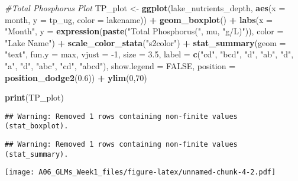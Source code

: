 \documentclass[]{article}
\newenvironment{Shaded}{\begin{snugshade}}{\end{snugshade}}
\newcommand{\CommentTok}[1]{\textcolor[rgb]{0.56,0.35,0.01}{\textit{#1}}}
\newcommand{\DataTypeTok}[1]{\textcolor[rgb]{0.13,0.29,0.53}{#1}}
\newcommand{\DecValTok}[1]{\textcolor[rgb]{0.00,0.00,0.81}{#1}}
\newcommand{\FloatTok}[1]{\textcolor[rgb]{0.00,0.00,0.81}{#1}}
\newcommand{\KeywordTok}[1]{\textcolor[rgb]{0.13,0.29,0.53}{\textbf{#1}}}
\newcommand{\NormalTok}[1]{#1}
\newcommand{\OperatorTok}[1]{\textcolor[rgb]{0.81,0.36,0.00}{\textbf{#1}}}
\newcommand{\OtherTok}[1]{\textcolor[rgb]{0.56,0.35,0.01}{#1}}
\newcommand{\StringTok}[1]{\textcolor[rgb]{0.31,0.60,0.02}{#1}}
\begin{document}
\begin{Shaded}
\begin{Highlighting}[]
\CommentTok{#Total Phosphorus Plot}
\NormalTok{TP_plot <-}\StringTok{ }\KeywordTok{ggplot}\NormalTok{(lake_nutrients_depth, }\KeywordTok{aes}\NormalTok{(}\DataTypeTok{x =}\NormalTok{ month, }\DataTypeTok{y =}\NormalTok{ tp_ug, }\DataTypeTok{color =}\NormalTok{ lakename)) }\OperatorTok{+}
\StringTok{  }\KeywordTok{geom_boxplot}\NormalTok{() }\OperatorTok{+}
\StringTok{  }\KeywordTok{labs}\NormalTok{(}\DataTypeTok{x =} \StringTok{"Month"}\NormalTok{, }\DataTypeTok{y =} \KeywordTok{expression}\NormalTok{(}\KeywordTok{paste}\NormalTok{(}\StringTok{"Total Phosphorus("}\NormalTok{, mu, }\StringTok{"g/L)"}\NormalTok{)), }
       \DataTypeTok{color =} \StringTok{"Lake Name"}\NormalTok{) }\OperatorTok{+}
\StringTok{  }\KeywordTok{scale_color_stata}\NormalTok{(}\StringTok{"s2color"}\NormalTok{) }\OperatorTok{+}
\StringTok{  }\KeywordTok{stat_summary}\NormalTok{(}\DataTypeTok{geom =} \StringTok{"text"}\NormalTok{, }\DataTypeTok{fun.y =}\NormalTok{ max, }\DataTypeTok{vjust =} \DecValTok{-1}\NormalTok{, }\DataTypeTok{size =} \FloatTok{3.5}\NormalTok{,}
               \DataTypeTok{label =} \KeywordTok{c}\NormalTok{(}\StringTok{"cd"}\NormalTok{, }\StringTok{"bcd"}\NormalTok{, }\StringTok{"d"}\NormalTok{, }\StringTok{"ab"}\NormalTok{, }\StringTok{"d"}\NormalTok{, }\StringTok{"a"}\NormalTok{, }
                         \StringTok{"d"}\NormalTok{, }\StringTok{"abc"}\NormalTok{, }\StringTok{"cd"}\NormalTok{, }\StringTok{"abcd"}\NormalTok{),}
               \DataTypeTok{show.legend =} \OtherTok{FALSE}\NormalTok{,}
               \DataTypeTok{position =} \KeywordTok{position_dodge2}\NormalTok{(}\FloatTok{0.6}\NormalTok{)) }\OperatorTok{+}
\StringTok{  }\KeywordTok{ylim}\NormalTok{(}\DecValTok{0}\NormalTok{,}\DecValTok{70}\NormalTok{)}

\KeywordTok{print}\NormalTok{(TP_plot)}
\end{Highlighting}
\end{Shaded}

\begin{verbatim}
## Warning: Removed 1 rows containing non-finite values (stat_boxplot).
\end{verbatim}

\begin{verbatim}
## Warning: Removed 1 rows containing non-finite values (stat_summary).
\end{verbatim}

\texttt{[image: A06\_GLMs\_Week1\_files/figure-latex/unnamed-chunk-4-2.pdf]}
\end{document}
